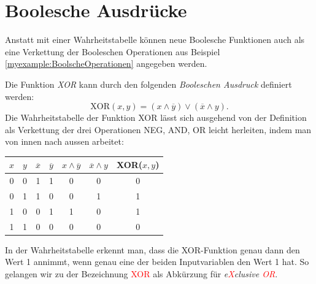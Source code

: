 \section{Boolesche Ausdrücke}
Anstatt mit einer Wahrheitstabelle können neue Boolesche Funktionen auch als eine Verkettung der Booleschen Operationen aus Beispiel \cref{myexample:BoolscheOperationen} angegeben werden. 
\begin{myexample}\label{myexample:XOR}
    Die Funktion \emph{XOR} kann durch den folgenden \emph{Booleschen Ausdruck} definiert werden:
    $$\mathrm{XOR}(x,y) = (x\wedge \overline{y}) \vee (\overline{x} \wedge y).$$ 
    Die Wahrheitstabelle der Funktion XOR lässt sich ausgehend von der Definition als Verkettung der drei Operationen NEG, AND, OR leicht herleiten, indem man von innen nach aussen arbeitet:
    \begin{center}
        \begin{tabular}{c|c||c|c| c |c || c}
            $x$ & $y$ & $\overline{x}$ & $\overline{y}$ & $x\wedge \overline{y}$ & $\overline{x} \wedge y$ & XOR($x, y$) \\
            \hline
            0&0&1&1&0&0&0 \\
            0&1&1&0&0&1&1 \\
            1&0&0&1&1&0&1 \\
            1&1&0&0&0&0&0 \\
        \end{tabular}
    \end{center}
    In der Wahrheitstabelle erkennt man, dass die XOR-Funktion genau dann den Wert 1 annimmt, wenn genau eine der beiden Inputvariablen den Wert 1 hat. So gelangen wir zu der Bezeichnung \textcolor{Red}{XOR} als Abkürzung für \emph{e\textcolor{Red}{X}clusive \textcolor{Red}{OR}}.
\end{myexample}

